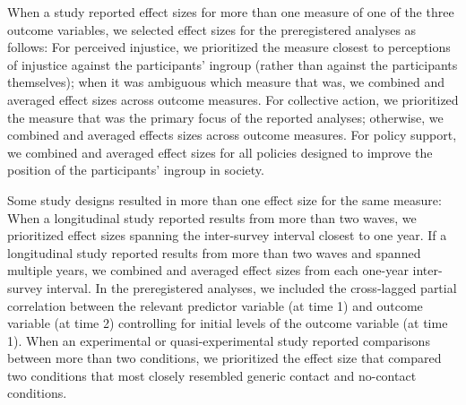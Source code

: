 \documentclass[twocolumn, 11pt, letterpaper]{article}
\begin{document}
When a study reported effect sizes for more than one measure of one of
the three outcome variables, we selected effect sizes for the
preregistered analyses as follows: For perceived injustice, we
prioritized the measure closest to perceptions of injustice against the
participants' ingroup (rather than against the participants themselves);
when it was ambiguous which measure that was, we combined and averaged
effect sizes across outcome measures. For collective action, we
prioritized the measure that was the primary focus of the reported
analyses; otherwise, we combined and averaged effects sizes across
outcome measures. For policy support, we combined and averaged effect
sizes for all policies designed to improve the position of the
participants' ingroup in society.

Some study designs resulted in more than one effect size for the same
measure: When a longitudinal study reported results from more than two
waves, we prioritized effect sizes spanning the inter-survey interval
closest to one year. If a longitudinal study reported results from more
than two waves and spanned multiple years, we combined and averaged
effect sizes from each one-year inter-survey interval. In the
preregistered analyses, we included the cross-lagged partial correlation
between the relevant predictor variable (at time 1) and outcome variable
(at time 2) controlling for initial levels of the outcome variable (at
time 1). When an experimental or quasi-experimental study reported
comparisons between more than two conditions, we prioritized the effect
size that compared two conditions that most closely resembled generic
contact and no-contact conditions.
\end{document}
